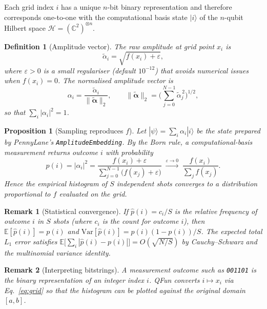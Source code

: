 \documentclass[11pt]{article}
\newtheorem{definition}{Definition}
\newtheorem{proposition}{Proposition}
\newtheorem{remark}{Remark}
\newcommand{\ket}[1]{|#1\rangle}
\newcommand{\norm}[1]{\|#1\|}
\newcommand{\E}{\mathbb{E}}
\newcommand{\calH}{\mathcal{H}}
\begin{document}
Each grid index $i$ has a unique $n$-bit binary representation and
therefore corresponds one-to-one with the computational basis state
$\ket{i}$ of the $n$-qubit Hilbert space
$\calH = (\mathbb{C}^{2})^{\otimes n}$.

\begin{definition}[Amplitude vector]\label{def:amps}
The \emph{raw amplitude} at grid point $x_i$ is
\begin{equation}\label{eq:raw_amp}
  \tilde{\alpha}_i = \sqrt{f(x_i) + \varepsilon},
\end{equation}
where $\varepsilon>0$ is a small regulariser (default $10^{-12}$)
that avoids numerical issues when $f(x_i)=0$.  The \emph{normalised
amplitude vector} is
\begin{equation}\label{eq:norm_amp}
  \alpha_i = \frac{\tilde{\alpha}_i}{\norm{\tilde{\bm\alpha}}_2},
  \qquad
  \norm{\tilde{\bm\alpha}}_2
  = \biggl(\sum_{j=0}^{N-1} \tilde{\alpha}_j^{\,2}\biggr)^{1/2},
\end{equation}
so that $\sum_i |\alpha_i|^2 = 1$.
\end{definition}

\begin{proposition}[Sampling reproduces $f$]\label{prop:born}
Let $\ket{\psi}=\sum_{i}\alpha_i\ket{i}$ be the state prepared by
PennyLane's \texttt{AmplitudeEmbedding}.  By the Born rule, a
computational-basis measurement returns outcome $i$ with probability
\begin{equation}\label{eq:born}
  p(i) = |\alpha_i|^2
  = \frac{f(x_i)+\varepsilon}
         {\sum_{j=0}^{N-1}\bigl(f(x_j)+\varepsilon\bigr)}
  \;\xrightarrow{\varepsilon\to 0}\;
  \frac{f(x_i)}{\sum_j f(x_j)}.
\end{equation}
Hence the empirical histogram of $S$ independent shots converges to a
distribution proportional to $f$ evaluated on the grid.
\end{proposition}

\begin{remark}[Statistical convergence]\label{rem:shots}
If $\hat{p}(i)=c_i/S$ is the relative frequency of outcome $i$ in
$S$ shots (where $c_i$ is the count for outcome $i$), then
$\E[\hat{p}(i)]=p(i)$ and
$\mathrm{Var}[\hat{p}(i)]=p(i)(1-p(i))/S$.  The expected total
$L_1$ error satisfies
$\E\bigl[\sum_i|\hat{p}(i)-p(i)|\bigr] = O\!\left(\sqrt{N/S}\right)$
by Cauchy--Schwarz and the multinomial variance identity.
\end{remark}

\begin{remark}[Interpreting bitstrings]
A measurement outcome such as \texttt{001101} is the binary
representation of an integer index $i$.  QFun converts
$i\mapsto x_i$ via Eq.~\eqref{eq:grid} so that the histogram can be
plotted against the original domain $[a,b]$.
\end{remark}
\end{document}
